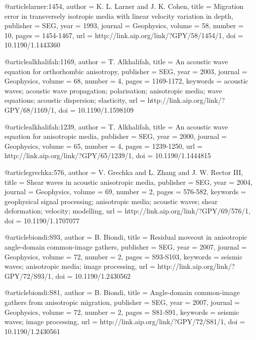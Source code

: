 @article{larner:1454,
  author =	 {K. L. Larner and J. K. Cohen},
  title =	 {Migration error in transversely isotropic media with
                  linear velocity variation in depth},
  publisher =	 {SEG},
  year =	 1993,
  journal =	 {Geophysics},
  volume =	 58,
  number =	 10,
  pages =	 {1454-1467},
  url =		 {http://link.aip.org/link/?GPY/58/1454/1},
  doi =		 {10.1190/1.1443360}
}

@article{alkhalifah:1169,
  author =	 {T. Alkhalifah},
  title =	 {An acoustic wave equation for orthorhombic
                  anisotropy},
  publisher =	 {SEG},
  year =	 2003,
  journal =	 {Geophysics},
  volume =	 68,
  number =	 4,
  pages =	 {1169-1172},
  keywords =	 {acoustic waves; acoustic wave propagation;
                  polarisation; anisotropic media; wave equations;
                  acoustic dispersion; elasticity},
  url =		 {http://link.aip.org/link/?GPY/68/1169/1},
  doi =		 {10.1190/1.1598109}
}

@article{alkhalifah:1239,
  author =	 {T. Alkhalifah},
  title =	 {An acoustic wave equation for anisotropic media},
  publisher =	 {SEG},
  year =	 2000,
  journal =	 {Geophysics},
  volume =	 65,
  number =	 4,
  pages =	 {1239-1250},
  url =		 {http://link.aip.org/link/?GPY/65/1239/1},
  doi =		 {10.1190/1.1444815}
}

@article{grechka:576,
  author =	 {V. Grechka and L. Zhang and J.
                  W. Rector III},
  title =	 {Shear waves in acoustic anisotropic media},
  publisher =	 {SEG},
  year =	 2004,
  journal =	 {Geophysics},
  volume =	 69,
  number =	 2,
  pages =	 {576-582},
  keywords =	 {geophysical signal processing; anisotropic media;
                  acoustic waves; shear deformation; velocity;
                  modelling},
  url =		 {http://link.aip.org/link/?GPY/69/576/1},
  doi =		 {10.1190/1.1707077}
}

@article{biondi:S93,
  author =	 {B. Biondi},
  title =	 {Residual moveout in anisotropic angle-domain
                  common-image gathers},
  publisher =	 {SEG},
  year =	 2007,
  journal =	 {Geophysics},
  volume =	 72,
  number =	 2,
  pages =	 {S93-S103},
  keywords =	 {seismic waves; anisotropic media; image processing},
  url =		 {http://link.aip.org/link/?GPY/72/S93/1},
  doi =		 {10.1190/1.2430562}
}

@article{biondi:S81,
  author =	 {B. Biondi},
  title =	 {Angle-domain common-image gathers from anisotropic
                  migration},
  publisher =	 {SEG},
  year =	 2007,
  journal =	 {Geophysics},
  volume =	 72,
  number =	 2,
  pages =	 {S81-S91},
  keywords =	 {seismic waves; image processing},
  url =		 {http://link.aip.org/link/?GPY/72/S81/1},
  doi =		 {10.1190/1.2430561}
}

